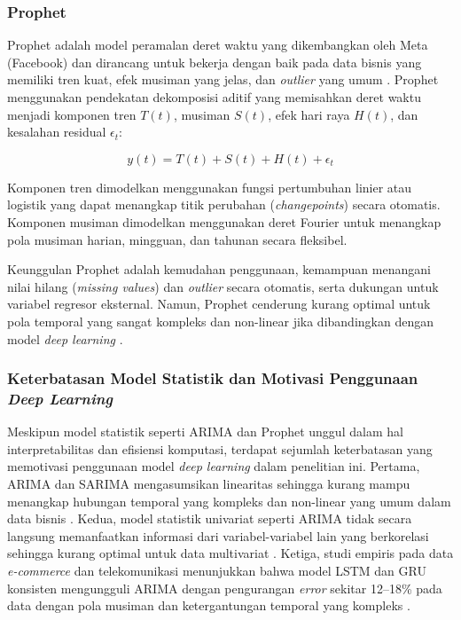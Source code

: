 \subsubsection{Prophet}

Prophet adalah model peramalan deret waktu yang dikembangkan oleh Meta (Facebook) dan dirancang untuk bekerja dengan baik pada data bisnis yang memiliki tren kuat, efek musiman yang jelas, dan \textit{outlier} yang umum \autocite{Tuncer2023ARIMAProphetLSTM,Masini2023MLTimeSeriesForecasting}. Prophet menggunakan pendekatan dekomposisi aditif yang memisahkan deret waktu menjadi komponen tren \(T(t)\)\label{sym:Tt}\label{sym:t}, musiman \(S(t)\)\label{sym:St}, efek hari raya \(H(t)\)\label{sym:Ht}, dan kesalahan residual \(\epsilon_t\):

\begin{equation}
y(t) = T(t) + S(t) + H(t) + \epsilon_t
\end{equation}

Komponen tren dimodelkan menggunakan fungsi pertumbuhan linier atau logistik yang dapat menangkap titik perubahan (\textit{changepoints}) secara otomatis. Komponen musiman dimodelkan menggunakan deret Fourier untuk menangkap pola musiman harian, mingguan, dan tahunan secara fleksibel.

Keunggulan Prophet adalah kemudahan penggunaan, kemampuan menangani nilai hilang (\textit{missing values}) dan \textit{outlier} secara otomatis, serta dukungan untuk variabel regresor eksternal. Namun, Prophet cenderung kurang optimal untuk pola temporal yang sangat kompleks dan non-linear jika dibandingkan dengan model \textit{deep learning} \autocite{Tuncer2023ARIMAProphetLSTM,Masini2023MLTimeSeriesForecasting}.

\subsubsection{Keterbatasan Model Statistik dan Motivasi Penggunaan \textit{Deep Learning}}

Meskipun model statistik seperti ARIMA dan Prophet unggul dalam hal interpretabilitas dan efisiensi komputasi, terdapat sejumlah keterbatasan yang memotivasi penggunaan model \textit{deep learning} dalam penelitian ini. Pertama, ARIMA dan SARIMA mengasumsikan linearitas sehingga kurang mampu menangkap hubungan temporal yang kompleks dan non-linear yang umum dalam data bisnis \autocite{Petropoulos2022ForecastingPractice,Spiliotis2020ForecastingBenchmarks}. Kedua, model statistik univariat seperti ARIMA tidak secara langsung memanfaatkan informasi dari variabel-variabel lain yang berkorelasi sehingga kurang optimal untuk data multivariat \autocite{Masini2023MLTimeSeriesForecasting}. Ketiga, studi empiris pada data \textit{e-commerce} dan telekomunikasi menunjukkan bahwa model LSTM dan GRU konsisten mengungguli ARIMA dengan pengurangan \textit{error} sekitar 12--18\% pada data dengan pola musiman dan ketergantungan temporal yang kompleks \autocite{Sunendar2025ComparisonARIMALSTMGRU,Tuncer2023ARIMAProphetLSTM}.


